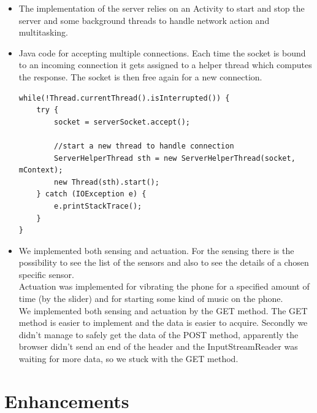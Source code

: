 \documentclass{report}
\begin{document}
\begin{itemize}
	\item The implementation of the server relies on an Activity to start and stop the server and some background threads to handle network action and multitasking. 
	\item Java code for accepting multiple connections. Each time the socket is bound to an incoming connection it gets assigned to a helper thread which computes the response. The socket is then free again for a new connection.
		\begin{lstlisting}
while(!Thread.currentThread().isInterrupted()) {
	try {
		socket = serverSocket.accept();	
							
		//start a new thread to handle connection
		ServerHelperThread sth = new ServerHelperThread(socket, mContext);
		new Thread(sth).start();
	} catch (IOException e) {
		e.printStackTrace();
	}
}	
		\end{lstlisting}
	\item We implemented both sensing and actuation. For the sensing there is the possibility to see the list of the sensors and also to see the details of a chosen specific sensor. \\
	Actuation was implemented for vibrating the phone for a specified amount of time (by the slider) and for starting some kind of music on the phone. \\
	We implemented both sensing and actuation by the GET method. The GET method is easier to implement and the data is easier to acquire. Secondly we didn't manage to safely get the data of the POST method, apparently the browser didn't send an end of the header and the InputStreamReader was waiting for more data, so we stuck with the GET method.
\end{itemize}

\section{Enhancements}
\end{document}
